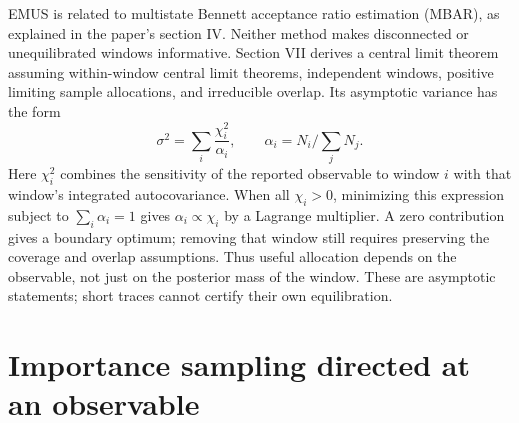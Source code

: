 EMUS is related to multistate Bennett acceptance ratio estimation (MBAR),
as explained in the paper's section IV. Neither method makes disconnected or
unequilibrated windows informative. Section VII derives a central limit
theorem assuming within-window central limit theorems, independent windows,
positive limiting sample allocations, and irreducible overlap. Its asymptotic
variance has the form
\begin{equation}
 \sigma^2=\sum_i\frac{\chi_i^2}{\alpha_i},\qquad
 \alpha_i=N_i/\sum_jN_j.
 \label{eq:rare-emus-allocation}
\end{equation}
Here $\chi_i^2$ combines the sensitivity of the reported observable to window
$i$ with that window's integrated autocovariance. When all $\chi_i>0$,
minimizing this expression subject to $\sum_i\alpha_i=1$ gives
$\alpha_i\propto\chi_i$ by a Lagrange multiplier. A zero contribution gives
a boundary optimum; removing that window still requires preserving the
coverage and overlap assumptions. Thus useful allocation depends on the observable, not just on the
posterior mass of the window. These are asymptotic statements; short traces
cannot certify their own equilibration.

\section[Importance sampling for an observable]{Importance sampling directed at an observable}

